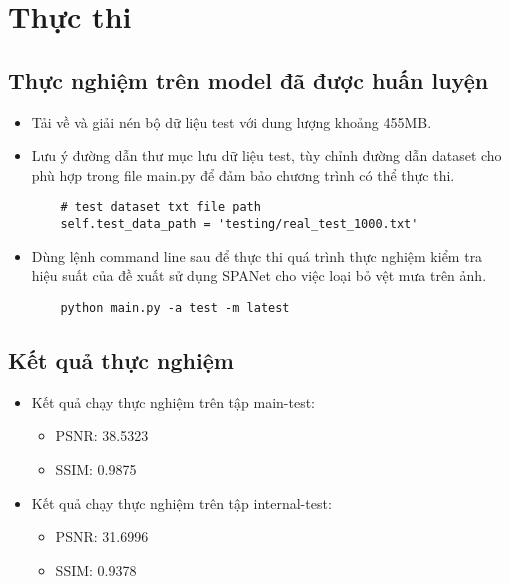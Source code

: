 \hspace{5mm}{
    \begin{lstlisting}
    Link github: https://github.com/stevewongv/SPANet
    \end{lstlisting}
}



\section{Thực thi}
\subsection{Thực nghiệm trên model đã được huấn luyện}
\begin{itemize}
    \item  Tải về và giải nén bộ dữ liệu test với dung lượng khoảng 455MB.
    \item  Lưu ý đường dẫn thư mục lưu dữ liệu test, tùy chỉnh đường dẫn dataset cho phù hợp trong file main.py để đảm bảo chương trình có thể thực thi.
    
    \begin{lstlisting}
    # test dataset txt file path
    self.test_data_path = 'testing/real_test_1000.txt'   
    \end{lstlisting}
    \item Dùng lệnh command line sau để thực thi quá trình thực nghiệm kiểm tra hiệu suất của đề xuất sử dụng SPANet cho việc loại bỏ vệt mưa trên ảnh.
    \begin{lstlisting}
    python main.py -a test -m latest
    \end{lstlisting}
\end{itemize}
\subsection{Kết quả thực nghiệm}
\hspace{10mm}{Kết quả thực nghiệm phương pháp SPANet được đánh giá qua hai chỉ số độ đo là Peak signal-to-noise ratio (PSNR),   Structural similarity index measure (SSIM).}
\begin{itemize}
    \item Kết quả chạy thực nghiệm trên tập main-test:
    \begin{itemize}
        \item PSNR: 38.5323
        \item SSIM: 0.9875
    \end{itemize}
    \item Kết quả chạy thực nghiệm trên tập internal-test:
    \begin{itemize}
        \item PSNR: 31.6996
        \item SSIM: 0.9378
    \end{itemize}
\end{itemize}

